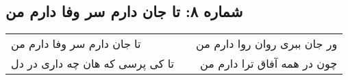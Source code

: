 \begin{center}
\section*{شماره ۸: تا جان دارم سر وفا دارم من}
\label{sec:008}
\begin{longtable}{l p{0.5cm} r}
تا جان دارم سر وفا دارم من
&&
ور جان ببری روان روا دارم من
\\
تا کی پرسی که هان چه داری در دل
&&
چون در همه آفاق ترا دارم من
\\
\end{longtable}
\end{center}
